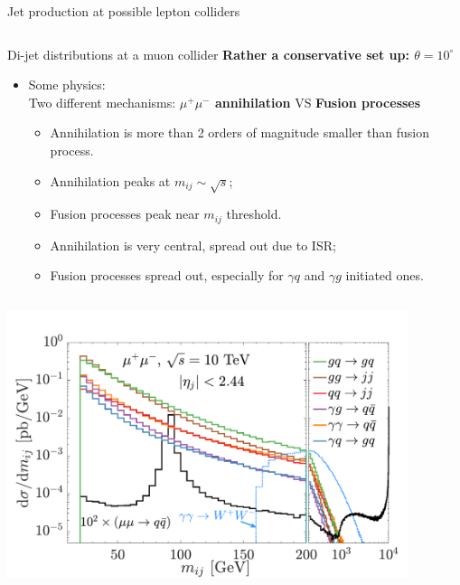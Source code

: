 \documentclass[aspectratio=169]{beamer}
\begin{document}
\begin{frame}{Jet production at possible lepton colliders}
\begin{columns}
\begin{column}{0.44\textwidth}
		\end{column}
	\end{columns}
\end{frame}

\begin{frame}{Di-jet distributions at a muon collider}
	\vspace{1mm}\textcolor{PittRoyal}{\bf Rather a conservative set up: $\theta =10^\circ$}
	\begin{itemize}
		\item Some physics:\\
		Two different mechanisms: \textcolor{PittRoyal}{\bf $\mu^+\mu^-$ annihilation} VS \textcolor{PittGold}{\bf Fusion processes}
		\begin{itemize}
			\item Annihilation is more than 2 orders of magnitude smaller than fusion process.
			\item Annihilation peaks at $m_{ij}\sim {\sqrt s}$; 
			\item Fusion processes peak near $m_{ij}$ threshold.
			\item Annihilation is very central, spread out due to ISR;
			\item Fusion processes spread out, especially for $\gamma q$ and $\gamma g$ initiated ones.
		\end{itemize}
	\end{itemize}
	\begin{columns}
		\begin{column}{0.44\textwidth}
			\includegraphics[width=0.88\textwidth]{figs/dMjj_mu10TeV_10d_3pt_s20}
	\end{column}
	\hspace{-5mm}

\end{columns}
\end{frame}
\end{document}
